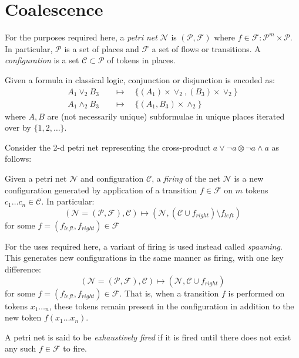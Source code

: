 \section{Coalescence}
    
    \begin{definition}
        For the purposes required here, a \textit{petri net} $\mathcal{N}$ is $(\mathcal{P, F})$ where $f \in \mathcal{F} : \mathcal{P}^m \times \mathcal{P}$.
        In particular, $\mathcal{P}$ is a set of places and $\mathcal{F}$ a set of flows or transitions.
        A \textit{configuration} is a set $\mathcal{C} \subset \mathcal{P}$ of tokens in places.

        Given a formula in classical logic, conjunction or disjunction is encoded as:
        \begin{align*}
            A_1 \vee_2 B_3    &\quad\mapsto\quad \{ (A_1) \times \vee_2, (B_3) \times \vee_2 \} \\
            A_1 \wedge_2 B_3 &\quad\mapsto\quad \{ (A_1, B_3) \times \wedge_2 \}
        \end{align*}
        where $A, B$ are (not necessarily unique) subformulae in unique places iterated over by $\{1, 2, \ldots\}$.
    \end{definition}

    \begin{example}
        Consider the 2-d petri net representing the cross-product $a \vee \neg a \otimes \neg a \wedge a$ as follows:
        
    \end{example}


    \begin{definition}
        Given a petri net $\mathcal{N}$ and configuration $\mathcal{C}$, a \textit{firing} of the net $\mathcal{N}$ is a new configuration generated by application of a transition $f \in \mathcal{F}$ on $m$ tokens $c_1 \ldots c_n \in \mathcal{C}$.
        In particular:
        \begin{equation*}
            (\mathcal{N = (P, F), C}) \mapsto (\mathcal{N}, (\mathcal{C} \cup f_{right}) \setminus f_{left})
        \end{equation*}
        for some $f = (f_{left}, f_{right}) \in \mathcal{F}$
        
        For the uses required here, a variant of firing is used instead called \textit{spawning}.
        This generates new configurations in the same manner as firing, with one key difference:
        \begin{equation*}
            (\mathcal{N = (P, F), C}) \mapsto (\mathcal{N}, \mathcal{C} \cup f_{right})
        \end{equation*}
        for some $f = (f_{left}, f_{right}) \in \mathcal{F}$.
        That is, when a transition $f$ is performed on tokens $x_1 \ldots _n$, these tokens remain present in the configuration in addition to the new token $f(x_1 \ldots x_n)$.
        
        A petri net is said to be \textit{exhaustively fired} if it is fired until there does not exist any such $f \in \mathcal{F}$ to fire.
    \end{definition}

